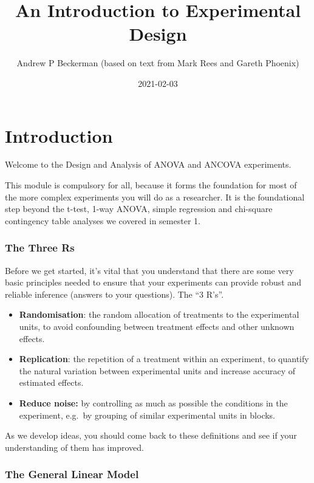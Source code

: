 \documentclass[
]{book}
\title{An Introduction to Experimental Design}
\author{Andrew P Beckerman (based on text from Mark Rees and Gareth Phoenix)}
\date{2021-02-03}
\providecommand{\tightlist}{%
  \setlength{\itemsep}{0pt}\setlength{\parskip}{0pt}}
\begin{document}
\maketitle

{
\setcounter{tocdepth}{1}
\tableofcontents
}
\hypertarget{introduction}{%
\chapter{Introduction}\label{introduction}}

Welcome to the Design and Analysis of ANOVA and ANCOVA experiments.

This module is compulsory for all, because it forms the foundation for most of the more complex experiments you will do as a researcher. It is the foundational step beyond the t-test, 1-way ANOVA, simple regression and chi-square contingency table analyses we covered in semester 1.

\hypertarget{the-three-rs}{%
\subsection{The Three Rs}\label{the-three-rs}}

Before we get started, it's vital that you understand that there are some very basic principles needed to ensure that your experiments can provide robust and reliable inference (answers to your questions). The ``3 R's''.

\begin{itemize}
\tightlist
\item
  \textbf{Randomisation}: the random allocation of treatments to the experimental units, to avoid confounding between treatment effects and other unknown effects.
\item
  \textbf{Replication}: the repetition of a treatment within an experiment, to quantify the natural variation between experimental units and increase accuracy of estimated effects.
\item
  \textbf{Reduce noise:} by controlling as much as possible the conditions in the experiment, e.g.~by grouping of similar experimental units in blocks.
\end{itemize}

As we develop ideas, you should come back to these definitions and see if your understanding of them has improved.

\hypertarget{the-general-linear-model}{%
\subsection{The General Linear Model}\label{the-general-linear-model}}
\end{document}
